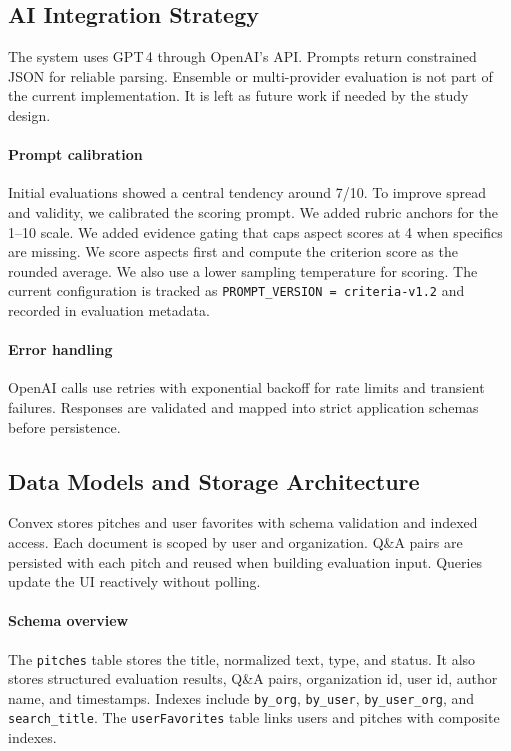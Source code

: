 \subsection{AI Integration Strategy}\label{subsec:ai-integration-strategy}
The system uses GPT\,4 through OpenAI's API. Prompts return constrained JSON for reliable parsing. Ensemble or multi-provider evaluation is not part of the current implementation. It is left as future work if needed by the study design.

\paragraph{Prompt calibration} Initial evaluations showed a central tendency around 7/10. To improve spread and validity, we calibrated the scoring prompt. We added rubric anchors for the 1--10 scale. We added evidence gating that caps aspect scores at 4 when specifics are missing. We score aspects first and compute the criterion score as the rounded average. We also use a lower sampling temperature for scoring. The current configuration is tracked as \texttt{PROMPT\_VERSION = criteria\textrm{-}v1.2} and recorded in evaluation metadata.

\paragraph{Error handling} OpenAI calls use retries with exponential backoff for rate limits and transient failures. Responses are validated and mapped into strict application schemas before persistence.

\subsection{Data Models and Storage Architecture}\label{subsec:data-models-and-storage-architecture}
Convex stores pitches and user favorites with schema validation and indexed access. Each document is scoped by user and organization. Q\&A pairs are persisted with each pitch and reused when building evaluation input. Queries update the UI reactively without polling.

\paragraph{Schema overview} The \texttt{pitches} table stores the title, normalized text, type, and status. It also stores structured evaluation results, Q\&A pairs, organization id, user id, author name, and timestamps. Indexes include \texttt{by\_org}, \texttt{by\_user}, \texttt{by\_user\_org}, and \texttt{search\_title}. The \texttt{userFavorites} table links users and pitches with composite indexes.

